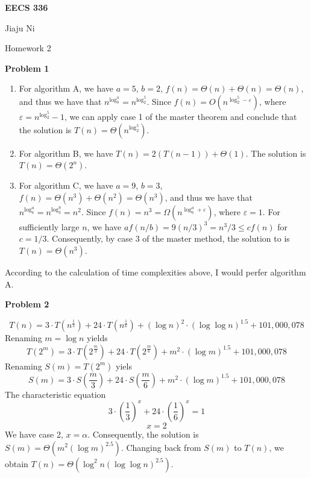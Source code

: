 \documentclass[12pt,letterpaper]{article}
\def\pp{\par\noindent}
\newcommand{\problem}[1]{ \bigskip \pp \textbf{Problem #1}\par}
\begin{document}
\centerline{\bf EECS 336}

\medskip
\centerline{Jiaju Ni}
\centerline{Homework 2}
\bigskip


\problem{1}
\begin{enumerate}[label=(\alph*)]
	\item For algorithm A, we have $a=5$, $b=2$, $f(n)=\Theta(n)+\Theta(n)=\Theta(n)$, and thus we have that $n^{\log_b^a}=n^{\log_2^5}$. Since $f(n)=O(n^{\log_2^5-\varepsilon})$, where $\varepsilon=n^{\log_2^5}-1$, we can apply case 1 of the master theorem and conclude that the solution is $T(n)=\Theta(n^{\log_2^5})$.
	\item For algorithm B, we have $T(n)=2(T(n-1))+\Theta(1)$. The solution is $T(n)=\Theta(2^n)$.
	\item For algorithm C, we have $a=9$, $b=3$, $f(n)=\Theta(n^3)+\Theta(n^2)=\Theta(n^3)$, and thus we have that $n^{\log_b^a}=n^{\log_3^9}=n^2$. Since $f(n)=n^3=\Omega(n^{\log_b^a+\varepsilon})$, where $\varepsilon=1$. For sufficiently large $n$, we have $af(n/b)=9(n/3)^3=n^3/3\leq cf(n)$ for $c=1/3$. Consequently, by case 3 of the master method, the solution to is $T(n)=\Theta(n^3)$.
\end{enumerate}
According to the calculation of time complexities above, I would perfer algorithm A.

\problem{2}
\[T(n)=3\cdot T(n^{\frac{1}{3}})+24\cdot T(n^{\frac{1}{6}})+(\log n)^2\cdot(\log\log n)^{1.5}+101,000,078\]
Renaming $m=\log n$ yields
\[T(2^m)=3\cdot T(2^\frac{m}{3})+24\cdot T(2^\frac{m}{6})+m^2\cdot(\log m)^{1.5}+101,000,078\]
Renaming $S(m)=T(2^m)$ yiels
\[S(m)=3\cdot S(\frac{m}{3})+24\cdot S(\frac{m}{6})+m^2\cdot(\log m)^{1.5}+101,000,078\]
The characteristic equation
\[3\cdot(\frac{1}{3})^x+24\cdot(\frac{1}{6})^x=1\]
\[x=2\]
We have case 2, $x=\alpha$. Consequently, the solution is $S(m)=\Theta(m^2(\log m)^{2.5})$. Changing back from $S(m)$ to $T(n)$, we obtain $T(n)=\Theta(\log^2n(\log\log n)^{2.5})$.
\end{document}
